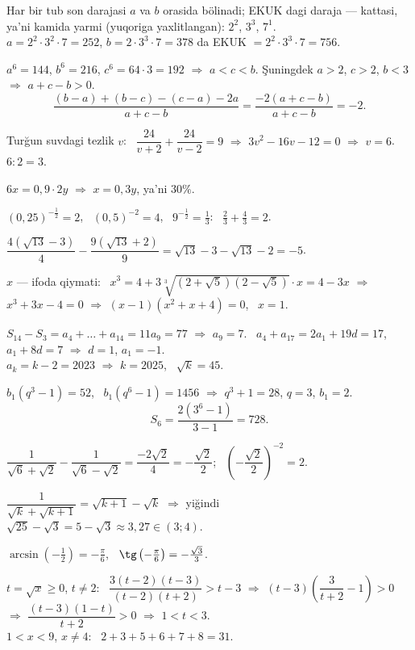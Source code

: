 




Har bir tub son darajasi $a$ va $b$ orasida bölinadi; EKUK dagi daraja — kattasi, ya'ni kamida yarmi (yuqoriga yaxlitlangan): $2^2$, $3^3$, $7^1$.\\
$a=2^2\cdot3^2\cdot7=252$, $b=2\cdot3^3\cdot7=378$ da EKUK $=2^2\cdot3^3\cdot7=756$.

$a^6=144$, $b^6=216$, $c^6=64\cdot3=192$ $\Rightarrow$ $a<c<b$. Şuningdek $a>2$, $c>2$, $b<3$ $\Rightarrow$ $a+c-b>0$.
\[\frac{(b-a)+(b-c)-(c-a)-2a}{a+c-b}=\frac{-2(a+c-b)}{a+c-b}=-2.\]

Turğun suvdagi tezlik $v$: \ $\dfrac{24}{v+2}+\dfrac{24}{v-2}=9$ $\Rightarrow$ $3v^2-16v-12=0$ $\Rightarrow$ $v=6$. \ $6:2=3$.

$6x=0{,}9\cdot2y$ $\Rightarrow$ $x=0{,}3y$, ya'ni $30\%$.

$(0{,}25)^{-\frac12}=2$, \ $(0{,}5)^{-2}=4$, \ $9^{-\frac12}=\frac13$: \ $\frac23+\frac43=2$.

$\dfrac{4\left(\sqrt{13}-3\right)}{4}-\dfrac{9\left(\sqrt{13}+2\right)}9=\sqrt{13}-3-\sqrt{13}-2=-5$.

$x$ — ifoda qiymati: \ $x^3=4+3\sqrt[3]{(2+\sqrt5)(2-\sqrt5)}\cdot x=4-3x$ $\Rightarrow$ $x^3+3x-4=0$ $\Rightarrow$ $(x-1)\left(x^2+x+4\right)=0$, \ $x=1$.

$S_{14}-S_3=a_4+\dots+a_{14}=11a_9=77$ $\Rightarrow$ $a_9=7$. \ $a_4+a_{17}=2a_1+19d=17$, \ $a_1+8d=7$ $\Rightarrow$ $d=1$, $a_1=-1$.\\
$a_k=k-2=2023$ $\Rightarrow$ $k=2025$, \ $\sqrt k=45$.

$b_1\left(q^3-1\right)=52$, \ $b_1\left(q^6-1\right)=1456$ $\Rightarrow$ $q^3+1=28$, $q=3$, $b_1=2$.
\[S_6=\frac{2\left(3^6-1\right)}{3-1}=728.\]

$\dfrac1{\sqrt6+\sqrt2}-\dfrac1{\sqrt6-\sqrt2}=\dfrac{-2\sqrt2}4=-\dfrac{\sqrt2}2$; \ $\left(-\dfrac{\sqrt2}2\right)^{-2}=2$.

$\dfrac1{\sqrt k+\sqrt{k+1}}=\sqrt{k+1}-\sqrt k$ $\Rightarrow$ yiğindi $\sqrt{25}-\sqrt3=5-\sqrt3\approx3{,}27\in(3;4)$.

$\arcsin\left(-\frac12\right)=-\frac\pi6$, \ $\tg\left(-\frac\pi6\right)=-\frac{\sqrt3}3$.

$t=\sqrt x\ge0$, $t\ne2$: \ $\dfrac{3(t-2)(t-3)}{(t-2)(t+2)}>t-3$ $\Rightarrow$ $(t-3)\left(\dfrac3{t+2}-1\right)>0$ $\Rightarrow$ $\dfrac{(t-3)(1-t)}{t+2}>0$ $\Rightarrow$ $1<t<3$.\\
$1<x<9$, $x\ne4$: \ $2+3+5+6+7+8=31$.

